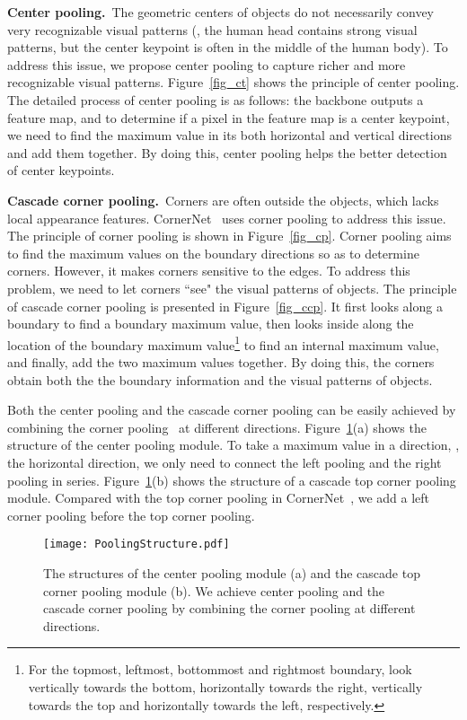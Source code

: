 \documentclass[10pt,twocolumn,letterpaper]{article}
\begin{document}
\noindent\textbf{Center pooling.}~The geometric centers of objects do not necessarily convey very recognizable visual patterns (\eg, the human head contains strong visual patterns, but the center keypoint is often in the middle of the human body). To address this issue, we propose center pooling to capture richer and more recognizable visual patterns. Figure~\ref{fig_ct} shows the principle of center pooling. The detailed process of center pooling is as follows: the backbone outputs a feature map, and to determine if a pixel in the feature map is a center keypoint, we need to find the maximum value in its both horizontal and vertical directions and add them together. By doing this, center pooling helps the better detection of center keypoints.

\vspace{1ex}\noindent\textbf{Cascade corner pooling.}~Corners are often outside the objects, which lacks local appearance features. CornerNet~\cite{law2018cornernet} uses corner pooling to address this issue. The principle of corner pooling is shown in Figure~\ref{fig_cp}. Corner pooling aims to find the maximum values on the boundary directions so as to determine corners. However, it makes corners sensitive to the edges. To address this problem, we need to let corners ``see" the visual patterns of objects. The principle of cascade corner pooling is presented in Figure~\ref{fig_ccp}. It first looks along a boundary to find a boundary maximum value, then looks inside along the location of the boundary maximum value\footnote{For the topmost, leftmost, bottommost and rightmost boundary, look vertically towards the bottom, horizontally towards the right, vertically towards the top and horizontally towards the left, respectively.} to find an internal maximum value, and finally, add the two maximum values together. By doing this, the corners obtain both the the boundary information and the visual patterns of objects.

Both the center pooling and the cascade corner pooling can be easily achieved by combining the corner pooling~\cite{law2018cornernet} at different directions. Figure~\ref{PoolingStructure}{\color{red}(a)} shows the structure of the center pooling module. To take a maximum value in a direction, \eg, the horizontal direction, we only need to connect the left pooling and the right pooling in series. Figure~\ref{PoolingStructure}{\color{red}(b)} shows the structure of a cascade top corner pooling module. Compared with the top corner pooling in CornerNet~\cite{law2018cornernet}, we add a left corner pooling before the top corner pooling.
\begin{figure}[tb]
  \centering 
  \texttt{[image: PoolingStructure.pdf]}
  \vspace{-4ex}
  \caption{The structures of the center pooling module (a) and the cascade top corner pooling module (b). We achieve center pooling and the cascade corner pooling by combining the corner pooling at different directions.} 
  \label{PoolingStructure} 
\end{figure}
\end{document}
